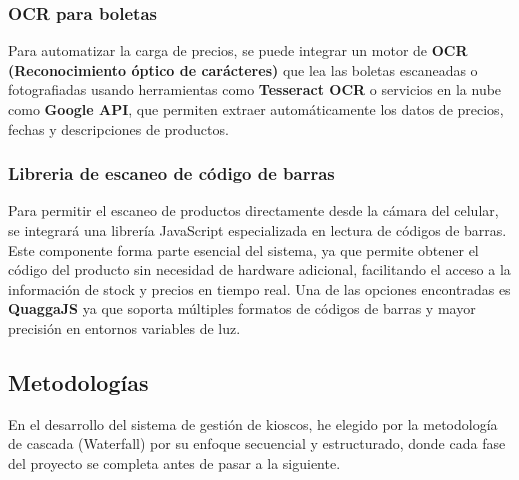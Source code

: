 \documentclass[twoside]{article}
\begin{document}
\subsubsection{OCR para boletas}
Para automatizar la carga de precios, se puede integrar un motor de \textbf{OCR (Reconocimiento óptico de carácteres)} que lea las boletas escaneadas o fotografiadas usando herramientas como \textbf{Tesseract OCR} o servicios en la nube como \textbf{Google API}, que permiten extraer automáticamente los datos de precios, fechas y descripciones de productos. \cite{githubGitHubTesseractocrtesseract}

\subsubsection{Libreria de escaneo de código de barras}
Para permitir el escaneo de productos directamente desde la cámara del celular, se integrará una librería JavaScript especializada en lectura de códigos de barras. Este componente forma parte esencial del sistema, ya que permite obtener el código del producto sin necesidad de hardware adicional, facilitando el acceso a la información de stock y precios en tiempo real. Una de las opciones encontradas es \textbf{QuaggaJS} ya que soporta múltiples formatos de códigos de barras y  mayor precisión en entornos variables de luz. \cite{serratusQuaggaJSAdvanced}

\newpage
\subsection{Metodologías}
En el desarrollo del sistema de gestión de kioscos, he elegido por la metodología de cascada (Waterfall) por su enfoque secuencial y estructurado, donde cada fase del proyecto se completa antes de pasar a la siguiente. 
\end{document}

